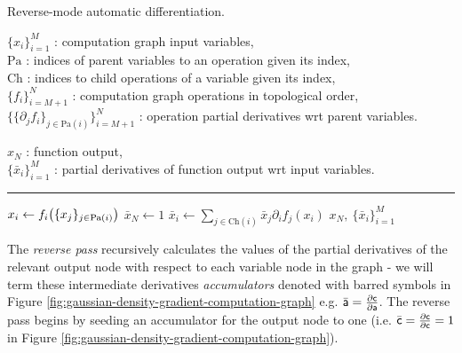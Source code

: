 \begin{algorithm}[!t]
\caption{Reverse-mode automatic differentiation.}
\label{alg:reverse-mode-ad}
\begin{algorithmic}
\small
    \Require
    $\lbrace x_i \rbrace_{i=1}^M$ : computation graph input variables,\\
    $\textrm{Pa}$ : indices of parent variables to an operation given its index,\\
    $\textrm{Ch}$ : indices to child operations of a variable given its index,\\
    $\lbrace f_i \rbrace_{i=M+1}^N$ : computation graph operations in topological order,\\%
    $\big\lbrace \lbrace \partial_j f_i\rbrace_{j \in \textrm{Pa}(i)}\big\rbrace_{i=M+1}^N$ : operation partial derivatives \acs{wrt} parent variables.\vspace{0.5mm}
    \Ensure\raggedright
    $x_{N}$ : function output,\\
    $\lbrace \bar{x}_i \rbrace_{i=1}^{M}$ : partial derivatives of function output \acs{wrt} input variables.
\end{algorithmic}
\hrule
\small
\begin{algorithmic}[1]
   
    \vspace{0.5mm}
    \State $x_i \gets f_i\lpa \lbrace x_j \rbrace_{j \in \textrm{Pa}(i)}\rpa$
  \EndFor
  \State $\bar{x}_N \gets 1$  
    \State $\bar{x}_i \gets \sum_{j \in \textrm{Ch}(i)} \bar{x}_j \partial_i{f_j}(x_i)$
  \EndFor
  \State \Return $x_N,~ \lbrace \bar{x}_i \rbrace_{i=1}^{M}$
\end{algorithmic}
\end{algorithm}

The \emph{reverse pass} recursively calculates the values of the partial derivatives of the relevant output node with respect to each variable node in the graph - we will term these intermediate derivatives \emph{accumulators} denoted with barred symbols in Figure \ref{fig:gaussian-density-gradient-computation-graph} e.g. $\bar{\mathsf{a}} = \frac{\partial \mathsf{c}}{\partial \mathsf{a}}$. The reverse pass begins by seeding an accumulator for the output node to one (i.e. $\bar{\mathsf{c}} = \frac{\partial \mathsf{c}}{\partial \mathsf{c}} = 1$ in Figure \ref{fig:gaussian-density-gradient-computation-graph}). 


